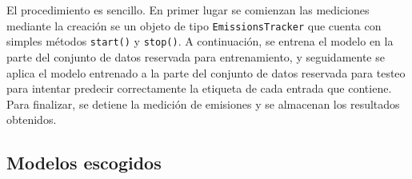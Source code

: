 El procedimiento es sencillo. En primer lugar se comienzan las mediciones mediante la creación se un objeto de tipo \texttt{EmissionsTracker} que cuenta con simples métodos \texttt{start()} y \texttt{stop()}. A continuación, se entrena el modelo en la parte del conjunto de datos reservada para entrenamiento, y seguidamente se aplica el modelo entrenado a la parte del conjunto de datos reservada para testeo para intentar predecir correctamente la etiqueta de cada entrada que contiene. Para finalizar, se detiene la medición de emisiones y se almacenan los resultados obtenidos.


\subsection{Modelos escogidos}
\label{subsec:models-short}

